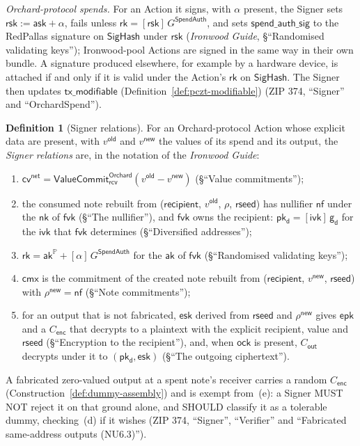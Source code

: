 \documentclass[11pt,a4paper]{article}
\theoremstyle{definition}
\newtheorem{definition}[theorem]{Definition}
\newcommand{\PP}{\mathbb{P}}
\newcommand{\nfsym}{\mathsf{nf}}
\newcommand{\cmx}{\mathsf{cmx}}
\newcommand{\cvsym}{\mathsf{cv}}
\newcommand{\rk}{\mathsf{rk}}
\newcommand{\ask}{\ensuremath{\mathsf{ask}}}
\newcommand{\aksym}{\ensuremath{\mathsf{ak}}}
\newcommand{\nksym}{\ensuremath{\mathsf{nk}}}
\newcommand{\ivk}{\ensuremath{\mathsf{ivk}}}
\newcommand{\fvk}{\ensuremath{\mathsf{fvk}}}
\newcommand{\pkd}{\ensuremath{\mathsf{pk_d}}}
\newcommand{\gd}{\ensuremath{\mathsf{g_d}}}
\newcommand{\rcv}{\ensuremath{\mathsf{rcv}}}
\newcommand{\rsk}{\ensuremath{\mathsf{rsk}}}
\begin{document}
\emph{Orchard-protocol spends.} For an Action it signs, with $\alpha$
present, the Signer sets $\rsk := \ask + \alpha$, fails unless $\rk =
[\rsk]\,G^{\mathsf{SpendAuth}}$, and sets $\mathsf{spend\_auth\_sig}$ to the
RedPallas signature on $\mathsf{SigHash}$ under $\rsk$ (\emph{Ironwood
Guide}, \S``Randomised validating keys''); Ironwood-pool Actions are signed
in the same way in their own bundle. A signature produced elsewhere, for
example by a hardware device, is attached if and only if it is valid under
the Action's $\rk$ on $\mathsf{SigHash}$. The Signer then updates
$\mathsf{tx\_modifiable}$ (Definition~\ref{def:pczt-modifiable}) (ZIP 374,
``Signer'' and ``OrchardSpend'').

\begin{definition}[Signer relations]\label{def:pczt-signer-checks}
For an Orchard-protocol Action whose explicit data are present, with
$v^{\mathsf{old}}$ and $v^{\mathsf{new}}$ the values of its spend and its
output, the \emph{Signer relations} are, in the notation of the
\emph{Ironwood Guide}:
\begin{enumerate}[label=(\alph*)]
\item $\cvsym^{\mathsf{net}} =
  \mathsf{ValueCommit}^{\mathsf{Orchard}}_{\rcv}(v^{\mathsf{old}} -
  v^{\mathsf{new}})$ (\S``Value commitments'');
\item the consumed note rebuilt from ($\mathsf{recipient}$,
  $v^{\mathsf{old}}$, $\rho$, $\mathsf{rseed}$) has nullifier $\nfsym$ under
  the $\nksym$ of $\fvk$ (\S``The nullifier''), and $\fvk$ owns the
  recipient: $\pkd = [\ivk]\,\gd$ for the $\ivk$ that $\fvk$ determines
  (\S``Diversified addresses'');
\item $\rk = \aksym^{\PP} + [\alpha]\,G^{\mathsf{SpendAuth}}$ for the
  $\aksym$ of $\fvk$ (\S``Randomised validating keys'');
\item $\cmx$ is the commitment of the created note rebuilt from
  ($\mathsf{recipient}$, $v^{\mathsf{new}}$, $\mathsf{rseed}$) with
  $\rho^{\mathsf{new}} = \nfsym$ (\S``Note commitments'');
\item for an output that is not fabricated, $\mathsf{esk}$ derived from
  $\mathsf{rseed}$ and $\rho^{\mathsf{new}}$ gives $\mathsf{epk}$ and a
  $C_{\mathsf{enc}}$ that decrypts to a plaintext with the explicit
  recipient, value and $\mathsf{rseed}$ (\S``Encryption to the
  recipient''), and, when $\mathsf{ock}$ is present, $C_{\mathsf{out}}$
  decrypts under it to $(\pkd, \mathsf{esk})$ (\S``The outgoing
  ciphertext'').
\end{enumerate}
A fabricated zero-valued output at a spent note's receiver carries a random
$C_{\mathsf{enc}}$ (Construction~\ref{def:dummy-assembly}) and is exempt
from~(e): a Signer MUST NOT reject it on that ground alone, and SHOULD
classify it as a tolerable dummy, checking~(d) if it wishes (ZIP 374,
``Signer'', ``Verifier'' and ``Fabricated same-address outputs (NU6.3)'').
\end{definition}
\end{document}
